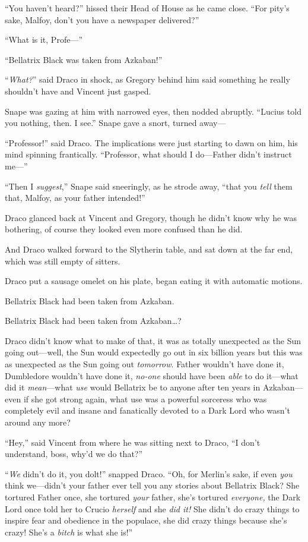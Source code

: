 “You haven’t heard?” hissed their Head of House as he came close. “For pity’s sake, Malfoy, don’t you have a newspaper delivered?”

“What is it, Profe—”

“Bellatrix Black was taken from Azkaban!”

“\emph{What?}” said Draco in shock, as Gregory behind him said something he really shouldn’t have and Vincent just gasped.

Snape was gazing at him with narrowed eyes, then nodded abruptly. “Lucius told you nothing, then. I see.” Snape gave a snort, turned away—

“Professor!” said Draco. The implications were just starting to dawn on him, his mind spinning frantically. “Professor, what should I do—Father didn’t instruct me—”

“Then I \emph{suggest},” Snape said sneeringly, as he strode away, “that you \emph{tell} them that, Malfoy, as your father intended!”

Draco glanced back at Vincent and Gregory, though he didn’t know why he was bothering, of course they looked even more confused than he did.

And Draco walked forward to the Slytherin table, and sat down at the far end, which was still empty of sitters.

Draco put a sausage omelet on his plate, began eating it with automatic motions.

Bellatrix Black had been taken from Azkaban.

Bellatrix Black had been taken from Azkaban…?

Draco didn’t know what to make of that, it was as totally unexpected as the Sun going out—well, the Sun would expectedly go out in six billion years but this was as unexpected as the Sun going out \emph{tomorrow}. Father wouldn’t have done it, Dumbledore wouldn’t have done it, \emph{no-one} should have been \emph{able} to do it—what did it \emph{mean}—what \emph{use} would Bellatrix be to anyone after ten years in Azkaban—even if she got strong again, what use was a powerful sorceress who was completely evil and insane and fanatically devoted to a Dark Lord who wasn’t around any more?

“Hey,” said Vincent from where he was sitting next to Draco, “I don’t understand, boss, why’d we do that?”

“\emph{We} didn’t do it, you dolt!” snapped Draco. “Oh, for Merlin’s sake, if even \emph{you} think we—didn’t your father ever tell you any stories about Bellatrix Black? She tortured Father once, she tortured \emph{your} father, she’s tortured \emph{everyone,} the Dark Lord once told her to Crucio \emph{herself} and she \emph{did it!} She didn’t do crazy things to inspire fear and obedience in the populace, she did crazy things because she’s crazy! She’s a \emph{bitch} is what she is!”

